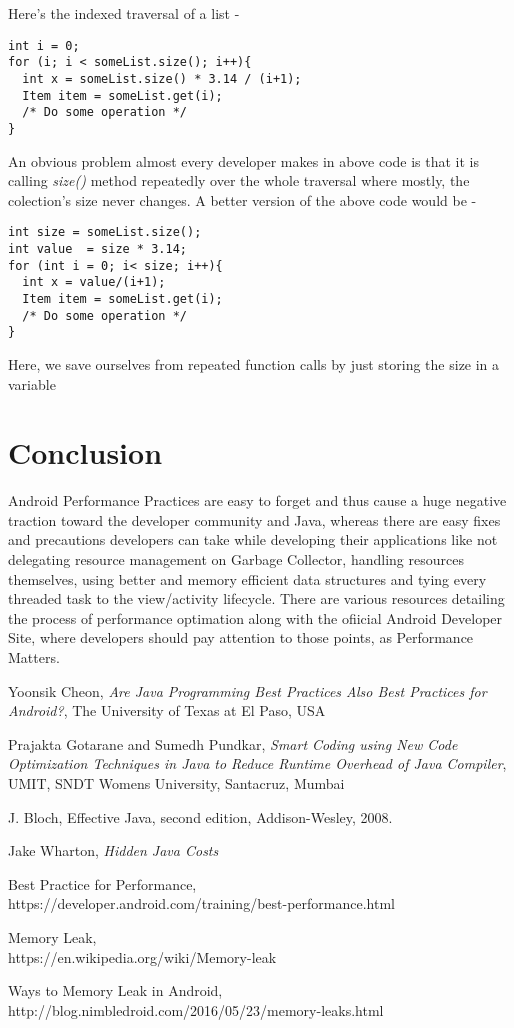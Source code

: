 \documentclass[journal]{IEEEtran}
\begin{document}
Here's the indexed traversal of a list -
\begin{verbatim}
int i = 0;
for (i; i < someList.size(); i++){
  int x = someList.size() * 3.14 / (i+1);
  Item item = someList.get(i);
  /* Do some operation */
} 
\end{verbatim}
An obvious problem almost every developer makes in above code is that it is calling \textit{size()} method repeatedly over the whole traversal where mostly, the colection's size never changes. A better version of the above code would be - 
\begin{verbatim}
int size = someList.size();
int value  = size * 3.14;
for (int i = 0; i< size; i++){
  int x = value/(i+1);
  Item item = someList.get(i);
  /* Do some operation */	
}
\end{verbatim}
Here, we save ourselves from repeated function calls by just storing the size in a variable

\section{Conclusion}
Android Performance Practices are easy to forget and thus cause a huge negative traction toward the developer community and Java, whereas there are easy fixes and precautions developers can take while developing their applications like not delegating resource management on Garbage Collector, handling resources themselves, using better and memory efficient data structures and tying every threaded task to the view/activity lifecycle. There are various resources detailing the process of performance optimation along with the ofiicial Android Developer Site, where developers should pay attention to those points, as Performance Matters.

\begin{thebibliography}{1}

\bibitem{}
Yoonsik Cheon, \emph{Are Java Programming Best Practices Also Best Practices for Android?}, The University of Texas at El Paso, USA

\bibitem{}
Prajakta Gotarane and Sumedh Pundkar, \emph{Smart Coding using New Code Optimization Techniques in Java to Reduce Runtime Overhead of Java Compiler}, UMIT, SNDT Womens University, Santacruz, Mumbai

\bibitem{}
J. Bloch, Effective Java, second edition, Addison-Wesley, 2008.

\bibitem{}
Jake Wharton, \emph{Hidden Java Costs}

\bibitem{}
Best Practice for Performance,\\
https://developer.android.com/training/best-performance.html 

\bibitem{}
Memory Leak,\\
https://en.wikipedia.org/wiki/Memory-leak

\bibitem{}
Ways to Memory Leak in Android,\\
http://blog.nimbledroid.com/2016/05/23/memory-leaks.html

\end{thebibliography}
\end{document}
